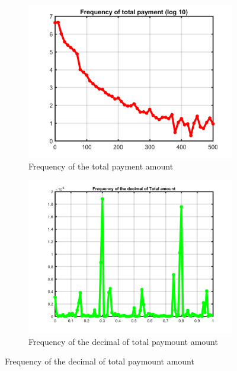 \documentclass{article}
\begin{document}
\begin{figure}
\begin{subfigure}{.5\linewidth}
  \centering
  \includegraphics[width=.8\linewidth]{frequency-totalpayment}
  \caption{Frequency of the total payment amount}
  \label{fig:sub3}
\end{subfigure}%
\begin{subfigure}{.5\linewidth}
  \centering
  \includegraphics[width=.8\linewidth]{frequency-decimal-totalamount}
  \caption{Frequency of the decimal of total paymount amount}
  \label{fig:sub4}
\end{subfigure}


\end{figure}
\end{document}
